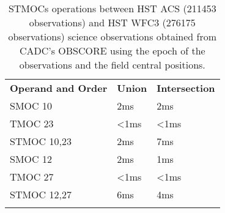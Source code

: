 \begin{table}[!htbp]
\begin{center}
{\scriptsize
\begin{tabular}{p{}p{}p{}}
\sptablerule
\textbf{Operand and Order} & \textbf{Union} & \textbf{Intersection} \\
\sptablerule
SMOC 10	&2ms&	2ms \\
TMOC 23&	<1ms&	<1ms \\
STMOC 10,23&	2ms&	7ms \\
SMOC 12&	2ms&	1ms \\
TMOC 27&	<1ms&	<1ms \\
STMOC 12,27&	6ms&	4ms \\
\sptablerule
\end{tabular}
\caption[STMOC operation performances]{STMOCs operations between HST ACS (211453 observations) and HST WFC3 (276175 observations) science observations obtained from CADC's OBSCORE using the epoch of the observations and the field central positions.}
\normalsize
\label{table:stmocopsacs}
}
\end{center}
\end{table}

